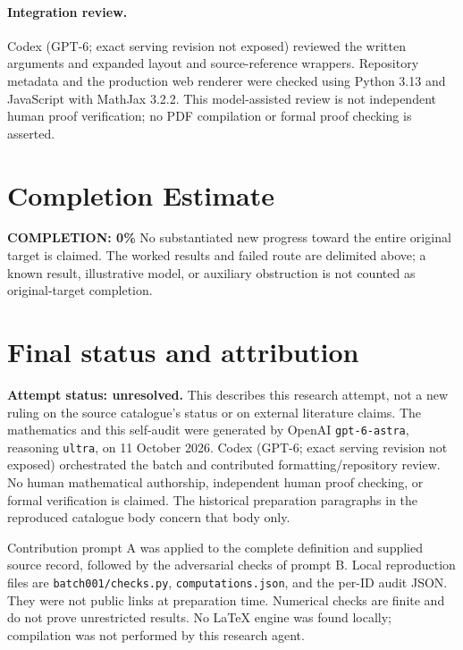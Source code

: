 \documentclass[11pt,a4paper]{article}
\begin{document}
\paragraph{Integration review.} Codex (GPT-6; exact serving revision not exposed) reviewed the written arguments and expanded layout and source-reference wrappers. Repository metadata and the production web renderer were checked using Python 3.13 and JavaScript with MathJax 3.2.2. This model-assisted review is not independent human proof verification; no PDF compilation or formal proof checking is asserted.

\section{Completion Estimate}
\noindent\textbf{COMPLETION: 0\%}
No substantiated new progress toward the entire original target is claimed. The worked results and failed route are delimited above; a known result, illustrative model, or auxiliary obstruction is not counted as original-target completion.

\section{Final status and attribution}
\textbf{Attempt status: unresolved.} This describes this research attempt, not a new ruling on the source catalogue's status or on external literature claims.
The mathematics and this self-audit were generated by OpenAI \texttt{gpt-6-astra}, reasoning \texttt{ultra}, on 11 October 2026. Codex (GPT-6; exact serving revision not exposed) orchestrated the batch and contributed formatting/repository review. No human mathematical authorship, independent human proof checking, or formal verification is claimed. The historical preparation paragraphs in the reproduced catalogue body concern that body only.

Contribution prompt A was applied to the complete definition and supplied source record, followed by the adversarial checks of prompt B. Local reproduction files are \texttt{batch001/checks.py}, \texttt{computations.json}, and the per-ID audit JSON. They were not public links at preparation time. Numerical checks are finite and do not prove unrestricted results. No LaTeX engine was found locally; compilation was not performed by this research agent.
\end{document}

